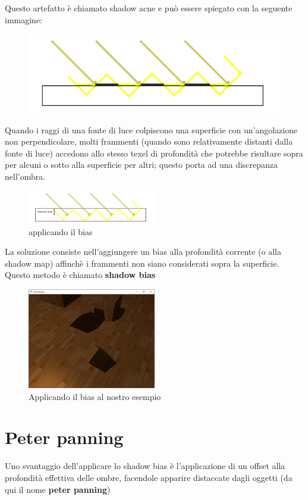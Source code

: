 \documentclass[12pt]{report}
\begin{document}
Questo artefatto è chiamato shadow acne e può essere spiegato con la seguente immagine:

\begin{figure}[H]
    \centering
    \includegraphics[width=0.5\linewidth]{img/shadow_mapping_acne_diagram.png}
\end{figure}

Quando i raggi di una fonte di luce colpiscono una superficie con un'angolazione non perpendicolare, molti frammenti (quando sono relativamente distanti dalla fonte di luce) accedono allo stesso texel di profondità che potrebbe risultare sopra per alcuni o sotto alla superficie per altri; questo porta ad una discrepanza nell'ombra.

\begin{figure}[H]
        \centering
        \includegraphics[width=0.5\textwidth]{img/shadow_mapping_acne_bias.png}
        \caption{applicando il bias}
\end{figure}
La soluzione consiste nell'aggiungere un bias alla profondità corrente (o alla shadow map) affinchè i frammenti non siano considerati sopra la superficie. Questo metodo è chiamato \textbf{shadow bias}



\begin{figure}[H]
        \centering
        \includegraphics[width=0.5\textwidth]{img/shadow_mapping_with_bias.png}
        \caption{Applicando il bias al nostro esempio}
\end{figure}

\section{Peter panning}
Uno svantaggio dell'applicare lo shadow bias è l'applicazione di un offset alla profondità effettiva delle ombre, facendole apparire distaccate dagli oggetti (da qui il nome \textbf{peter panning})
\end{document}

